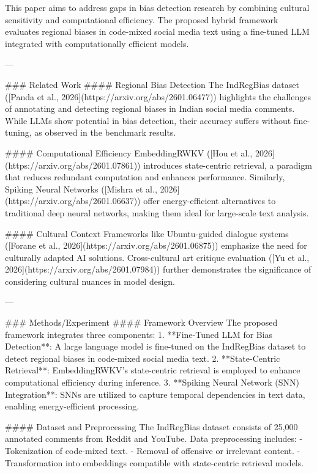 This paper aims to address gaps in bias detection research by combining cultural sensitivity and computational efficiency. The proposed hybrid framework evaluates regional biases in code-mixed social media text using a fine-tuned LLM integrated with computationally efficient models.

---

### Related Work  
#### Regional Bias Detection  
The IndRegBias dataset ([Panda et al., 2026](https://arxiv.org/abs/2601.06477)) highlights the challenges of annotating and detecting regional biases in Indian social media comments. While LLMs show potential in bias detection, their accuracy suffers without fine-tuning, as observed in the benchmark results.

#### Computational Efficiency  
EmbeddingRWKV ([Hou et al., 2026](https://arxiv.org/abs/2601.07861)) introduces state-centric retrieval, a paradigm that reduces redundant computation and enhances performance. Similarly, Spiking Neural Networks ([Mishra et al., 2026](https://arxiv.org/abs/2601.06637)) offer energy-efficient alternatives to traditional deep neural networks, making them ideal for large-scale text analysis.

#### Cultural Context  
Frameworks like Ubuntu-guided dialogue systems ([Forane et al., 2026](https://arxiv.org/abs/2601.06875)) emphasize the need for culturally adapted AI solutions. Cross-cultural art critique evaluation ([Yu et al., 2026](https://arxiv.org/abs/2601.07984)) further demonstrates the significance of considering cultural nuances in model design.

---

### Methods/Experiment  
#### Framework Overview  
The proposed framework integrates three components:  
1. **Fine-Tuned LLM for Bias Detection**: A large language model is fine-tuned on the IndRegBias dataset to detect regional biases in code-mixed social media text.  
2. **State-Centric Retrieval**: EmbeddingRWKV's state-centric retrieval is employed to enhance computational efficiency during inference.  
3. **Spiking Neural Network (SNN) Integration**: SNNs are utilized to capture temporal dependencies in text data, enabling energy-efficient processing.

#### Dataset and Preprocessing  
The IndRegBias dataset consists of 25,000 annotated comments from Reddit and YouTube. Data preprocessing includes:  
- Tokenization of code-mixed text.  
- Removal of offensive or irrelevant content.  
- Transformation into embeddings compatible with state-centric retrieval models.

